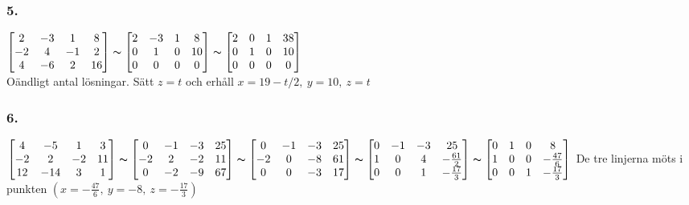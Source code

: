 \documentclass{article}
\begin{document}
\subsubsection*{5.}
$\begin{bmatrix}
2&-3&1&8\\
-2&4&-1&2\\
4&-6&2&16
\end{bmatrix}\thicksim
\begin{bmatrix}
2&-3&1&8\\
0&1&0&10\\
0&0&0&0
\end{bmatrix}\thicksim
\begin{bmatrix}
2&0&1&38\\
0&1&0&10\\
0&0&0&0
\end{bmatrix}
$\\ Oändligt antal lösningar. Sätt $z=t$ och erhåll $x=19-t/2,\ y=10,\ z=t$

\subsubsection*{6.}
$\begin{bmatrix}
4 &-5 &1 &3 \\
-2&2 &-2 &11 \\
12 &-14 &3 &1
\end{bmatrix}\thicksim
\begin{bmatrix}
0 &-1 &-3 &25 \\
-2 &2 &-2 &11 \\
0 &-2 &-9 &67
\end{bmatrix}\thicksim
\begin{bmatrix}
0 &-1 &-3 &25 \\
-2 &0 &-8 &61 \\
0 &0 &-3 &17
\end{bmatrix}\thicksim
\begin{bmatrix}
0 &-1 &-3 &25 \\
1 &0 &4 &-\frac{61}{2} \\
0 &0 &1 &-\frac{17}{3}
\end{bmatrix}\thicksim
\begin{bmatrix}
0 &1 &0 &8 \\
1 &0 &0 &-\frac{47}{6}\\
0 &0 &1 &-\frac{17}{3}
\end{bmatrix}
$ De tre linjerna möts i punkten $(x=-\frac{47}{6},\ y=-8,\ z=-\frac{17}{3})$
\end{document}
